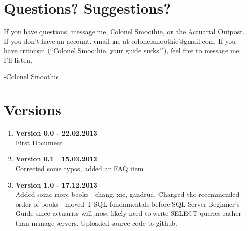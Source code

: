 \documentclass[oneside, titlepage]{article}
\begin{document}
\begin{enumerate}
\end{enumerate}

\section{Questions? Suggestions?}
If you have questions, message me, Colonel Smoothie, on the Actuarial Outpost. If you don't have an account, email me at colonelsmoothie@gmail.com. If you have criticism (``Colonel Smoothie, your guide sucks!"), feel free to message me. I'll listen.

-Colonel Smoothie

\section{Versions}
\begin{enumerate}
\item{\bfseries Version 0.0 - 22.02.2013}\\
First Document
\item{\bfseries Version 0.1 - 15.03.2013}\\
Corrected some typos, added an FAQ item
\item{\bfseries Version 1.0 - 17.12.2013}\\
Added some more books - chang, xie, gandrud. Changed the recommended order of books - moved T-SQL fundamentals before SQL Server Beginner's Guide since actuaries will most likely need to write SELECT queries rather than manage servers. Uploaded source code to github.

\end{enumerate}
\end{document}
